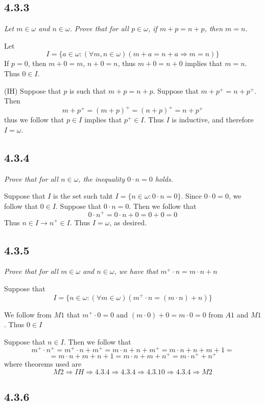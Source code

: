 \documentclass[11pt,oneside,titlepage]{book}
\DeclareMathOperator \ra {\Rightarrow}
\begin{document}
\subsection*{4.3.3}

\textit{Let $m \in \omega$ and $n \in \omega$. Prove that for all $p \in \omega$, if
  $m + p = n + p$, then $m = n$.}

Let
$$I = \{a \in \omega: (\forall m, n \in \omega)(m + a = n + a \ra m = n)\}$$
If $p = 0$, then $m + 0 = m$, $n + 0 = n$, thus $m + 0 = n + 0$ implies that $m = n$.
Thus $0 \in I$.

(IH) Suppose that $p$ is such that $m + p = n + p$. Suppose that $m + p^+ = n + p^+$. Then
$$m + p^+ = (m + p)^+ = (n + p)^+ = n + p^+$$
thus we follow that $p \in I$ implies that  $p^+ \in I$. Thus $I$ is inductive, and therefore
$I = \omega$.

\subsection*{4.3.4}

\textit{Prove that for all $n \in \omega$, the inequality $0 \cdot n = 0$ holds.}

Suppose that $I$ is the set such taht
$I = \{n \in \omega: 0 \cdot n = 0\}$.
Since $0 \cdot 0 = 0$, we follow that $0 \in I$. Suppose that $0 \cdot n = 0$. Then we follow that
$$0 \cdot n^+ = 0 \cdot n + 0 = 0 + 0 = 0$$
Thus $n \in I \to n^+ \in I$. Thus $I = \omega$, as desired.


\subsection*{4.3.5}

\textit{Prove that for all $m \in \omega$ and $n \in \omega$, we have that
  $m^+ \cdot n  = m \cdot n + n$}

Suppose that
$$I = \{n \in \omega: (\forall m \in \omega)(m^+ \cdot n  = (m \cdot n) + n)\}$$

We follow from $M1$ that $m^+ \cdot 0 = 0$  and $(m \cdot 0) + 0 = m \cdot 0 = 0$
from $A1$ and $M1$. Thus $0 \in I$

Suppose that $n \in I$. Then we follow that
$$m^+ \cdot n^+ = m^+ \cdot n + m^+ = m \cdot n + n + m^+ = m \cdot n + n + m + 1 = $$
$$= m \cdot n + m + n + 1  = m \cdot n + m + n^+ = m \cdot n^+ + n^+$$
where theorems used are
$$M2 \ra IH \ra 4.3.4 \ra 4.3.4 \ra  4.3.10 \ra 4.3.4 \ra M2$$

\subsection*{4.3.6}
\end{document}

